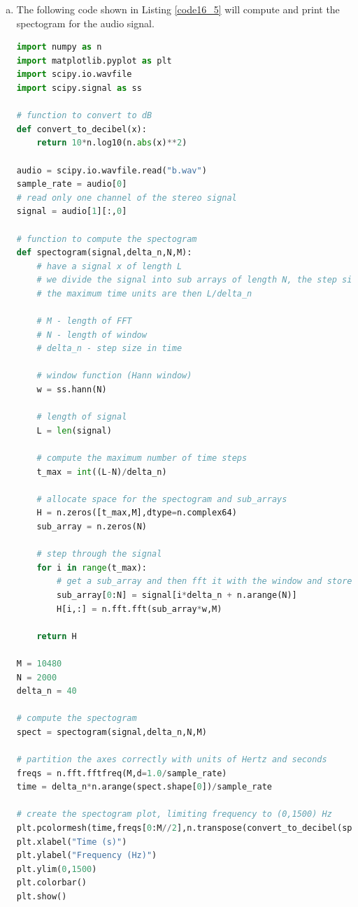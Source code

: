 \begin{enumerate}
\begin{enumerate}[a)]
\item The following code shown in Listing \ref{code16_5} will compute and print the spectogram for the audio signal. 
\begin{lstlisting}[language=Python, caption=Spectogram code,label=code16_5]
import numpy as n
import matplotlib.pyplot as plt
import scipy.io.wavfile
import scipy.signal as ss

# function to convert to dB
def convert_to_decibel(x):
    return 10*n.log10(n.abs(x)**2)

audio = scipy.io.wavfile.read("b.wav")
sample_rate = audio[0]
# read only one channel of the stereo signal
signal = audio[1][:,0]

# function to compute the spectogram
def spectogram(signal,delta_n,N,M):
    # have a signal x of length L
    # we divide the signal into sub arrays of length N, the step size is then delta_n
    # the maximum time units are then L/delta_n

    # M - length of FFT
    # N - length of window
    # delta_n - step size in time

    # window function (Hann window)
    w = ss.hann(N)

    # length of signal
    L = len(signal)

    # compute the maximum number of time steps
    t_max = int((L-N)/delta_n)

    # allocate space for the spectogram and sub_arrays
    H = n.zeros([t_max,M],dtype=n.complex64)
    sub_array = n.zeros(N)

    # step through the signal
    for i in range(t_max):
        # get a sub_array and then fft it with the window and store it in H
        sub_array[0:N] = signal[i*delta_n + n.arange(N)]
        H[i,:] = n.fft.fft(sub_array*w,M)

    return H

M = 10480
N = 2000
delta_n = 40

# compute the spectogram
spect = spectogram(signal,delta_n,N,M)

# partition the axes correctly with units of Hertz and seconds
freqs = n.fft.fftfreq(M,d=1.0/sample_rate)
time = delta_n*n.arange(spect.shape[0])/sample_rate

# create the spectogram plot, limiting frequency to (0,1500) Hz
plt.pcolormesh(time,freqs[0:M//2],n.transpose(convert_to_decibel(spect[:,0:M//2])),vmin=40)
plt.xlabel("Time (s)")
plt.ylabel("Frequency (Hz)")
plt.ylim(0,1500)
plt.colorbar()
plt.show()
\end{lstlisting}


\end{enumerate}
\end{enumerate}
